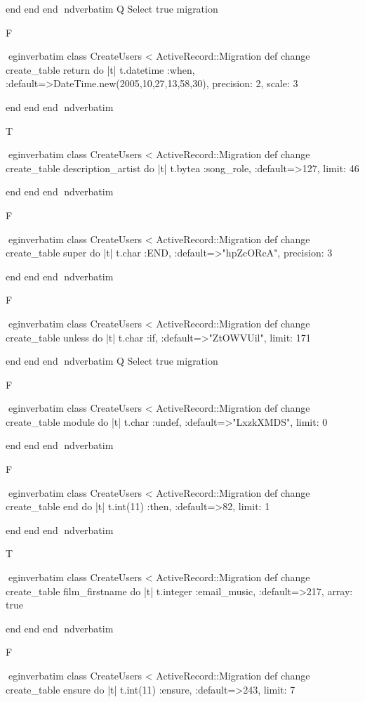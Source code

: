     end 
  end 
end
nd{verbatim}
Q
 Select true migration

F

egin{verbatim}
 class CreateUsers < ActiveRecord::Migration 
  def change 
    create_table return do |t| 
      t.datetime :when, :default=>DateTime.new(2005,10,27,13,58,30), precision: 2, scale: 3
    
    end 
  end 
end
nd{verbatim}

T

egin{verbatim}
 class CreateUsers < ActiveRecord::Migration 
  def change 
    create_table description_artist do |t| 
      t.bytea :song_role, :default=>127, limit: 46
    
    end 
  end 
end
nd{verbatim}

F

egin{verbatim}
 class CreateUsers < ActiveRecord::Migration 
  def change 
    create_table super do |t| 
      t.char :END, :default=>"hpZcORcA", precision: 3
    
    end 
  end 
end
nd{verbatim}

F

egin{verbatim}
 class CreateUsers < ActiveRecord::Migration 
  def change 
    create_table unless do |t| 
      t.char :if, :default=>"ZtOWVUil", limit: 171
    
    end 
  end 
end
nd{verbatim}
Q
 Select true migration

F

egin{verbatim}
 class CreateUsers < ActiveRecord::Migration 
  def change 
    create_table module do |t| 
      t.char :undef, :default=>"LxzkXMDS", limit: 0
    
    end 
  end 
end
nd{verbatim}

F

egin{verbatim}
 class CreateUsers < ActiveRecord::Migration 
  def change 
    create_table end do |t| 
      t.int(11) :then, :default=>82, limit: 1
    
    end 
  end 
end
nd{verbatim}

T

egin{verbatim}
 class CreateUsers < ActiveRecord::Migration 
  def change 
    create_table film_firstname do |t| 
      t.integer :email_music, :default=>217, array: true
    
    end 
  end 
end
nd{verbatim}

F

egin{verbatim}
 class CreateUsers < ActiveRecord::Migration 
  def change 
    create_table ensure do |t| 
      t.int(11) :ensure, :default=>243, limit: 7
    
